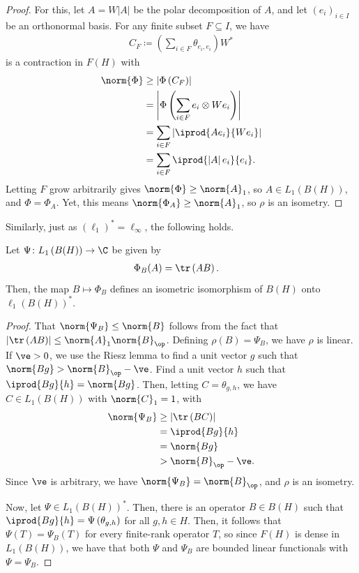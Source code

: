 \documentclass[10pt]{mypackage}
\begin{document}
\begin{proof}
  For this, let $A = W\left\vert A \right\vert$ be the polar decomposition of $A$, and let $\left( e_i \right)_{i\in I}$ be an orthonormal basis. For any finite subset $F\subseteq I$, we have
  \begin{align*}
    C_F\coloneq \left( \sum_{i\in F} \theta_{e_i,e_i} \right)W^{\ast}
  \end{align*}
  is a contraction in $F(H)$ with 
  \begin{align*}
    \norm{\Phi} &\geq \left\vert \Phi\left( C_F \right) \right\vert\\
                &= \left\vert \Phi\left( \sum_{i\in F} e_i\otimes We_i \right) \right\vert\\
                &= \sum_{i\in F} \left\vert \iprod{Ae_i}{We_i} \right\vert\\
                &= \sum_{i\in F} \iprod{\left\vert A \right\vert e_i}{e_i}.
  \end{align*}
  Letting $F$ grow arbitrarily gives $\norm{\Phi}\geq \norm{A}_1$, so $A\in L_1\left( B(H) \right)$, and $\Phi = \Phi_A$. Yet, this means $\norm{\Phi_A} \geq \norm{A}_1$, so $\rho$ is an isometry.
\end{proof}
Similarly, just as $\left( \ell_1 \right)^{\ast} = \ell_{\infty}$, the following holds.
\begin{theorem}
  Let $\Psi\colon L_1\left( B(H) \right)\rightarrow \C$ be given by
  \begin{align*}
    \Phi_B(A) &= \tr\left( AB \right).
  \end{align*}
  Then, the map $B\mapsto \Phi_B$ defines an isometric isomorphism of $B(H)$ onto $\ell_1\left( B(H) \right)^{\ast}$.
\end{theorem}
\begin{proof}
  That $\norm{\Psi_B}\leq \norm{B}$ follows from the fact that $\left\vert \tr\left( AB \right) \right\vert\leq \norm{A}_1\norm{B}_{\op}$. Defining $\rho(B) = \Psi_B$, we have $\rho$ is linear. If $\ve > 0$, we use the Riesz lemma to find a unit vector $g$ such that $\norm{Bg} > \norm{B}_{\op}-\ve$. Find a unit vector $h$ such that $ \iprod{Bg}{h} = \norm{Bg} $. Then, letting $C = \theta_{g,h}$, we have $C\in L_1\left( B(H) \right)$ with $\norm{C}_1 = 1$, with
  \begin{align*}
    \norm{\Psi_B} &\geq \left\vert \tr\left( BC \right) \right\vert\\
                  &= \iprod{Bg}{h}\\
                  &= \norm{Bg}\\
                  &> \norm{B}_{\op} - \ve.
  \end{align*}
  Since $\ve$ is arbitrary, we have $\norm{\Psi_B} = \norm{B}_{\op}$, and $\rho$ is an isometry.

  Now, let $\Psi\in L_1\left( B(H) \right)^{\ast}$. Then, there is an operator $B\in B(H)$ such that $ \iprod{Bg}{h} = \Psi\left( \theta_{g,h} \right) $ for all $g,h\in H$. Then, it follows that $\Psi(T) = \Psi_B(T)$ for every finite-rank operator $T$, so since $F(H)$ is dense in $L_1\left( B(H) \right)$, we have that both $\Psi$ and $\Psi_B$ are bounded linear functionals with $\Psi = \Psi_B$.
\end{proof}
\end{document}
